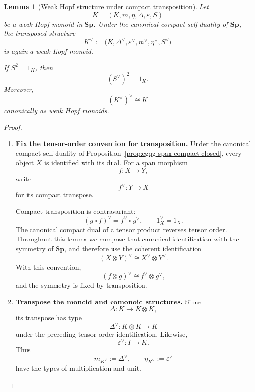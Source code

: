 \documentclass[oneside]{article}
\newcommand{\Sp}{\mathbf{Sp}}
\theoremstyle{plain}
\newtheorem{lemma}[theorem]{Lemma}
\theoremstyle{definition}
\theoremstyle{remark}
\begin{document}
\begin{lemma}[Weak Hopf structure under compact transposition]
\label{lem:cgqg-compact-transpose-weak-hopf}
    Let
    \[
        K=(K,m,\eta,\Delta,\varepsilon,S)
    \]
    be a weak Hopf monoid in \(\Sp\). Under the canonical compact self-duality of \(\Sp\), the transposed structure
    \[
        K^\vee
        :=
        \bigl(
            K,
            \Delta^\vee,
            \varepsilon^\vee,
            m^\vee,
            \eta^\vee,
            S^\vee
        \bigr)
    \]
    is again a weak Hopf monoid.

    If \(S^2=1_K\), then
    \[
        (S^\vee)^2=1_K.
    \]
    Moreover,
    \[
        (K^\vee)^\vee\cong K
    \]
    canonically as weak Hopf monoids.
\end{lemma}
\begin{proof}
    \leavevmode
    \begin{enumerate}[beginpenalty=10000]
        \item \textbf{Fix the tensor-order convention for transposition.}
        Under the canonical compact self-duality of
        Proposition~\ref{prop:cgqg-span-compact-closed}, every object
        \(X\) is identified with its dual. For a span morphism
        \[
            f:X\longrightarrow Y,
        \]
        write
        \[
            f^\vee:Y\longrightarrow X
        \]
        for its compact transpose.

        Compact transposition is contravariant:
        \[
            (g\circ f)^\vee
            =
            f^\vee\circ g^\vee,
            \qquad
            1_X^\vee=1_X.
        \]
        The canonical compact dual of a tensor product reverses tensor
        order. Throughout this lemma we compose that canonical
        identification with the symmetry of \(\Sp\), and therefore use
        the coherent identification
        \[
            (X\otimes Y)^\vee
            \cong
            X^\vee\otimes Y^\vee.
        \]
        With this convention,
        \[
            (f\otimes g)^\vee
            \cong
            f^\vee\otimes g^\vee,
        \]
        and the symmetry is fixed by transposition.

        \item \textbf{Transpose the monoid and comonoid structures.}
        Since
        \[
            \Delta:
            K\longrightarrow K\otimes K,
        \]
        its transpose has type
        \[
            \Delta^\vee:
            K\otimes K\longrightarrow K
        \]
        under the preceding tensor-order identification. Likewise,
        \[
            \varepsilon^\vee:I\longrightarrow K.
        \]
        Thus
        \[
            m_{K^\vee}:=\Delta^\vee,
            \qquad
            \eta_{K^\vee}:=\varepsilon^\vee
        \]
        have the types of multiplication and unit.


\end{enumerate}
\end{proof}
\end{document}
